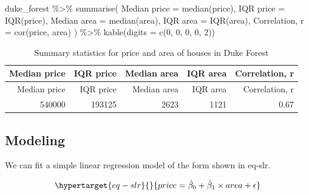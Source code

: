 \documentclass[
  letterpaper,
  DIV=11,
  numbers=noendperiod,
  oneside]{scrartcl}
\newenvironment{Shaded}{}{}
\newcommand{\AttributeTok}[1]{\textcolor[rgb]{0.49,0.56,0.16}{#1}}
\newcommand{\DecValTok}[1]{\textcolor[rgb]{0.25,0.63,0.44}{#1}}
\newcommand{\FunctionTok}[1]{\textcolor[rgb]{0.02,0.16,0.49}{#1}}
\newcommand{\NormalTok}[1]{#1}
\newcommand{\OtherTok}[1]{\textcolor[rgb]{0.00,0.44,0.13}{#1}}
\newcommand{\SpecialCharTok}[1]{\textcolor[rgb]{0.25,0.44,0.63}{#1}}
\newcommand{\StringTok}[1]{\textcolor[rgb]{0.25,0.44,0.63}{#1}}
\begin{document}
\begin{Shaded}
\begin{Highlighting}[]
\NormalTok{duke\_forest }\SpecialCharTok{\%\textgreater{}\%}
  \FunctionTok{summarise}\NormalTok{(}
    \StringTok{\textasciigrave{}}\AttributeTok{Median price}\StringTok{\textasciigrave{}} \OtherTok{=} \FunctionTok{median}\NormalTok{(price),}
    \StringTok{\textasciigrave{}}\AttributeTok{IQR price}\StringTok{\textasciigrave{}} \OtherTok{=} \FunctionTok{IQR}\NormalTok{(price),}
    \StringTok{\textasciigrave{}}\AttributeTok{Median area}\StringTok{\textasciigrave{}} \OtherTok{=} \FunctionTok{median}\NormalTok{(area),}
    \StringTok{\textasciigrave{}}\AttributeTok{IQR area}\StringTok{\textasciigrave{}} \OtherTok{=} \FunctionTok{IQR}\NormalTok{(area),}
    \StringTok{\textasciigrave{}}\AttributeTok{Correlation, r}\StringTok{\textasciigrave{}} \OtherTok{=} \FunctionTok{cor}\NormalTok{(price, area)}
\NormalTok{    ) }\SpecialCharTok{\%\textgreater{}\%}
  \FunctionTok{kable}\NormalTok{(}\AttributeTok{digits =} \FunctionTok{c}\NormalTok{(}\DecValTok{0}\NormalTok{, }\DecValTok{0}\NormalTok{, }\DecValTok{0}\NormalTok{, }\DecValTok{0}\NormalTok{, }\DecValTok{2}\NormalTok{))}
\end{Highlighting}
\end{Shaded}

\hypertarget{tbl-stats}{}
\begin{longtable}[]{@{}rrrrr@{}}
\caption{\label{tbl-stats}Summary statistics for price and area of
houses in Duke Forest}\tabularnewline
\toprule()
Median price & IQR price & Median area & IQR area & Correlation, r \\
\midrule()
\endfirsthead
\toprule()
Median price & IQR price & Median area & IQR area & Correlation, r \\
\midrule()
\endhead
540000 & 193125 & 2623 & 1121 & 0.67 \\
\bottomrule()
\end{longtable}

\hypertarget{sec-model}{%
\subsection{Modeling}\label{sec-model}}

We can fit a simple linear regression model of the form shown in eq-slr.

\begin{equation}\protect\hypertarget{eq-slr}{}{
price = \hat{\beta}_0 + \hat{\beta}_1 \times area + \epsilon
}\label{eq-slr}\end{equation}
\end{document}
